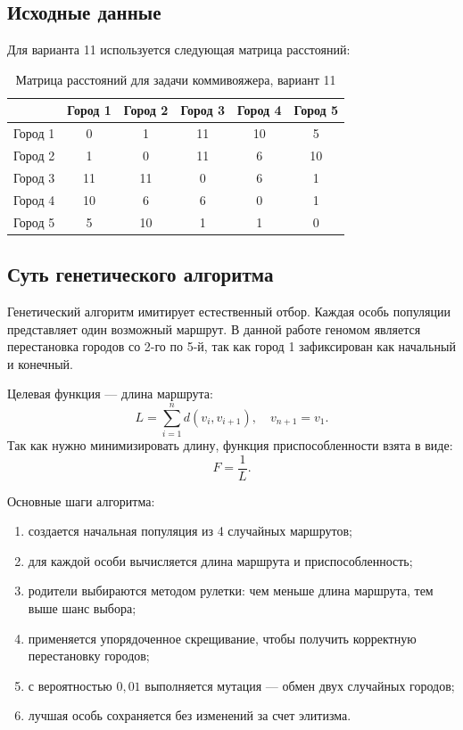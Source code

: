 \documentclass[12pt,a4paper]{article}
\begin{document}
\subsection{Исходные данные}
Для варианта 11 используется следующая матрица расстояний:

\begin{table}[h!]
\centering
\caption{Матрица расстояний для задачи коммивояжера, вариант 11}
\begin{tabular}{c|ccccc}
\toprule
 & Город 1 & Город 2 & Город 3 & Город 4 & Город 5 \\
\midrule
Город 1 & 0  & 1  & 11 & 10 & 5 \\
Город 2 & 1  & 0  & 11 & 6  & 10 \\
Город 3 & 11 & 11 & 0  & 6  & 1 \\
Город 4 & 10 & 6  & 6  & 0  & 1 \\
Город 5 & 5  & 10 & 1  & 1  & 0 \\
\bottomrule
\end{tabular}
\end{table}

\subsection{Суть генетического алгоритма}
Генетический алгоритм имитирует естественный отбор. Каждая особь популяции представляет один возможный маршрут. В данной работе геномом является перестановка городов со 2-го по 5-й, так как город 1 зафиксирован как начальный и конечный.

Целевая функция --- длина маршрута:
\[
L = \sum_{i=1}^{n} d(v_i, v_{i+1}), \quad v_{n+1}=v_1.
\]
Так как нужно минимизировать длину, функция приспособленности взята в виде:
\[
F = \frac{1}{L}.
\]

Основные шаги алгоритма:
\begin{enumerate}
    \item создается начальная популяция из 4 случайных маршрутов;
    \item для каждой особи вычисляется длина маршрута и приспособленность;
    \item родители выбираются методом рулетки: чем меньше длина маршрута, тем выше шанс выбора;
    \item применяется упорядоченное скрещивание, чтобы получить корректную перестановку городов;
    \item с вероятностью $0{,}01$ выполняется мутация --- обмен двух случайных городов;
    \item лучшая особь сохраняется без изменений за счет элитизма.
\end{enumerate}
\end{document}
